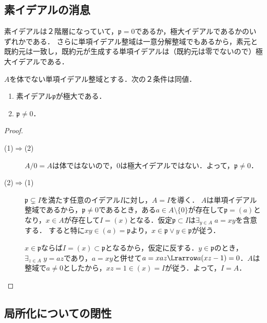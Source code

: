 \documentclass[uplatex,dvipdfmx]{jsreport}
\renewcommand{\p}{\mathfrak{p}}
\begin{document}
\subsection{素イデアルの消息}

\begin{tcolorbox}[colframe=ForestGreen, colback=ForestGreen!10!white,breakable,colbacktitle=ForestGreen!40!white,coltitle=black,fonttitle=\bfseries\sffamily,
title=]
    素イデアルは２階層になっていて，$\p=0$であるか，極大イデアルであるかのいずれかである．
    さらに単項イデアル整域は一意分解整域でもあるから，素元と既約元は一致し，既約元が生成する単項イデアルは（既約元は零でないので）極大イデアルである．
\end{tcolorbox}

\begin{proposition}[PIDの極大イデアルの特徴付け]\label{prop-maximal-ideal-of-PID}
    $A$を体でない単項イデアル整域とする．次の２条件は同値．
    \begin{enumerate}
        \item 素イデアル$\p$が極大である．
        \item $\p\ne 0$．
    \end{enumerate}
\end{proposition}
\begin{proof}\mbox{}
    \begin{description}
        \item[(1)$\Rightarrow$(2)] $A/0=A$は体ではないので，$0$は極大イデアルではない．よって，$\p\ne 0$．
        \item[(2)$\Rightarrow$(1)] $\p\subsetneq I$を満たす任意のイデアル$I$に対し，$A=I$を導く．
        $A$は単項イデアル整域であるから，$\p\ne 0$であるとき，ある$a\in A\setminus\{0\}$が存在して$\p=(a)$となり，$x\in A$が存在して$I=(x)$となる．仮定$\p\subset I$は$\exists_{y\in A}\; a=xy$を含意する．
        すると特に$xy\in(a)=\p$より，$x\in\p\lor y\in\p$が従う．

        $x\in\p$ならば$I=(x)\subset\p$となるから，仮定に反する．$y\in\p$のとき，$\exists_{z\in A}\;y=az$であり，$a=xy$と併せて$a=xaz\Lrarrow a(xz-1)=0$．$A$は整域で$a\ne 0$としたから，$xz=1\in(x)=I$が従う．よって，$I=A$．
    \end{description}
\end{proof}

\subsection{局所化についての閉性}
\end{document}
